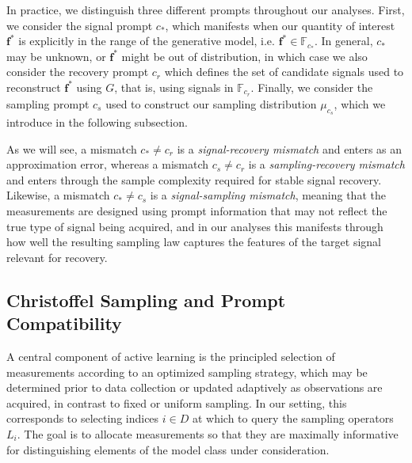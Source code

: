 \documentclass{article}
\theoremstyle{plain}
\theoremstyle{definition}
\theoremstyle{remark}
\begin{document}
In practice, we distinguish three different prompts throughout our analyses. First, we consider the signal prompt $c_*$, which manifests when our quantity of interest $\mathbf{f}^*$ is explicitly in the range of the generative model, i.e. $\mathbf{f}^* \in \mathbb{F}_{c_*}$. In general, $c_*$ may be unknown, or $\mathbf{f}^*$ might be out of distribution, in which case we also consider the recovery prompt $c_r$ which defines the set of candidate signals used to reconstruct $\mathbf{f}^*$ using $G$, that is, using signals in $\mathbb{F}_{c_r}$. Finally, we consider the sampling prompt $c_s$ used to construct our sampling distribution $\mu_{c_s}$, which we introduce in the following subsection. 

As we will see, a mismatch $c_* \neq c_r$ is a \emph{signal-recovery mismatch} and enters as an approximation error, whereas a mismatch $c_s \neq c_r$ is a \emph{sampling-recovery mismatch} and enters through the sample complexity required for stable signal recovery. Likewise, a mismatch $c_* \neq c_s$ is a \emph{signal-sampling mismatch}, meaning that the measurements are designed using prompt information that may not reflect the true type of signal being acquired, and in our analyses this manifests through how well the resulting sampling law captures the features of the target signal relevant for recovery.

\subsection{Christoffel Sampling and Prompt Compatibility}
A central component of active learning is the principled selection of measurements according to an optimized sampling strategy, which may be determined prior to data collection or updated adaptively as observations are acquired, in contrast to fixed or uniform sampling. In our setting, this corresponds to selecting indices $i \in D$ at which to query the sampling operators $L_i$. The goal is to allocate measurements so that they are maximally informative for distinguishing elements of the model class under consideration.
\end{document}
